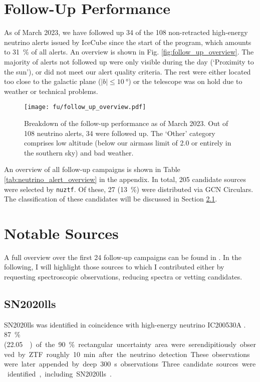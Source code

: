 \section{Follow-Up Performance}
As of March 2023, we have followed up 34 of the 108 non-retracted high-energy neutrino alerts issued by IceCube since the start of the program, which amounts to \SI{31}{\percent} of all alerts. An overview is shown in Fig. \ref{fig:follow_up_overview}. The majority of alerts not followed up were only visible during the day (`Proximity to the sun'), or did not meet our alert quality criteria. The rest were either located too close to the galactic plane ($|b|\leq\SI{10}{\degree}$) or the telescope was on hold due to weather or technical problems.

\begin{figure}[h!]
    \texttt{[image: fu/follow\_up\_overview.pdf]}
    \caption[Follow-up performance]{Breakdown of the follow-up performance as of March 2023. Out of 108 neutrino alerts, 34 were followed up. The `Other' category comprises low altitude (below our airmass limit of 2.0 or entirely in the southern sky) and bad weather.}
\end{figure}

An overview of all follow-up campaigns is shown in Table \ref{tab:neutrino_alert_overview} in the appendix. 
In total, 205 candidate sources were selected by \texttt{nuztf}. Of these, 27 (\SI{13}{\percent}) were distributed via GCN Circulars. The classification of these candidates will be discussed in Section \ref{SN2020lls}.

\section{Notable Sources}
A full overview over the first 24 follow-up campaigns can be found in . In the following, I will highlight those sources to which I contributed either by requesting spectroscopic observations, reducing spectra or vetting candidates.

\subsection{SN2020lls} \label{SN2020lls}
SN2020lls was identified in coincidence with high-energy neutrino IC200530A . \SI{87}{\percent} (\SI{22.05}{\square\deg}) of the \SI{90}{\percent} rectangular uncertainty area were serendipitiously observed by ZTF roughly \SI{10}{\minute} after the neutrino detection. These observations were later appended by deep \SI{300}{\second} observations Three candidate sources were identified, including SN2020lls . 

